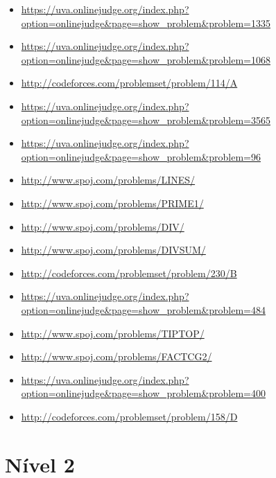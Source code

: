 \begin{itemize}
\item \url{https://uva.onlinejudge.org/index.php?option=onlinejudge&page=show_problem&problem=1335}
\item \url{https://uva.onlinejudge.org/index.php?option=onlinejudge&page=show_problem&problem=1068}
\item \url{http://codeforces.com/problemset/problem/114/A}
\item \url{https://uva.onlinejudge.org/index.php?option=onlinejudge&page=show_problem&problem=3565}
\item \url{https://uva.onlinejudge.org/index.php?option=onlinejudge&page=show_problem&problem=96}
\item \url{http://www.spoj.com/problems/LINES/}
\item \url{http://www.spoj.com/problems/PRIME1/}
\item \url{http://www.spoj.com/problems/DIV/}
\item \url{http://www.spoj.com/problems/DIVSUM/}
\item \url{http://codeforces.com/problemset/problem/230/B}
\item \url{https://uva.onlinejudge.org/index.php?option=onlinejudge&page=show_problem&problem=484}
\item \url{http://www.spoj.com/problems/TIPTOP/}
\item \url{http://www.spoj.com/problems/FACTCG2/}
\item \url{https://uva.onlinejudge.org/index.php?option=onlinejudge&page=show_problem&problem=400}
\item \url{http://codeforces.com/problemset/problem/158/D}
\end{itemize}


\section{Nível 2}

